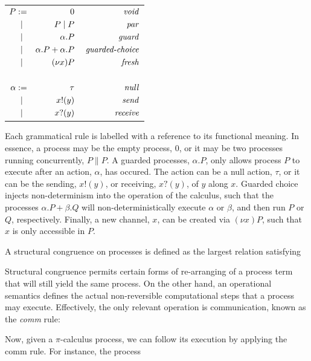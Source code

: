 \begin{center}
	\begin{tabular}{l }
		{$\!\begin{aligned}
			P & := & 0  & & \text{ \emph{void}}\\
			    & \; \| & P \| P  & & \text{ \emph{par}} \\
			    & \; \| & \alpha.P  & & \text{ \emph{guard}} \\
			    & \; \| & \alpha.P  + \alpha.P & & \text{ \emph{guarded-choice}} \\
			    & \; \| & (\nu x) P & & \text{ \emph{fresh}}\\ \\

			\alpha & := & \tau & & \text{ \emph{null}} \\
			    & \; \| & x!(y) & & \text{ \emph{send}} \\
			    & \; \| & x?(y) & & \text{ \emph{receive}}\\
		\end{aligned}$} \\ 
	\end{tabular}
\end{center}

Each grammatical rule is labelled with a reference to its functional meaning.
In essence, a process may be the empty process, $0$, 
or it may be two processes running concurrently, $P \| P$.
A guarded processes, $\alpha.P$, only allows process $P$ to execute after an action, $\alpha$,
has occured.
The action can be a null action, $\tau$, or it can be the sending, $x!(y)$, 
or receiving, $x?(y)$, of $y$ along $x$.
Guarded choice injects non-determinism into the operation of the calculus, 
such that the processes $\alpha.P + \beta.Q$ will non-deterministically execute
$\alpha$ or $\beta$, and then run $P$ or $Q$, respectively.
Finally, a new channel, $x$, can be created via $(\nu x) P$, such that $x$ is only accessible in $P$.

A structural congruence on processes is defined as the largest relation satisfying


Structural congruence permits certain forms of re-arranging of a process term that will still yield the same process.
On the other hand, an operational semantics defines the actual non-reversible computational steps that a process may execute.
Effectively, the only relevant operation is communication, known as the \emph{comm} rule:


Now, given a $\pi$-calculus process, we can follow its execution by applying the comm rule.
For instance, the process


